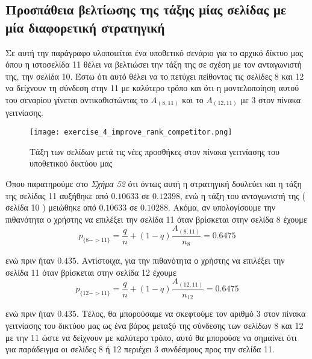 \documentclass[First Project.tex]{subfiles}
\begin{document}
\subsection{ Προσπάθεια βελτίωσης της τάξης μίας σελίδας με μία διαφορετική στρατηγική }

Σε αυτή την παράγραφο υλοποιείται ένα υποθετικό σενάριο για το αρχικό δίκτυο μας όπου η ιστοσελίδα 11 θέλει να
βελτιώσει την τάξη της σε σχέση με τον ανταγωνιστή της, την σελίδα 10. Έστω ότι αυτό θέλει να το πετύχει
πείθοντας τις σελίδες 8 και 12 να δείχνουν τη σύνδεση στην 11 με καλύτερο τρόπο και ότι η μοντελοποίηση αυτού 
του σεναρίου γίνεται αντικαθιστώντας το $A_{(8,11)}$ και το $Α_{(12,11)}$ με 3 στον πίνακα γειτνίασης. 

\begin{figure}[h!]
    \centering
    \captionsetup{justification=centering}
    \begin{center}
        \texttt{[image: exercise\_4\_improve\_rank\_competitor.png]}    
        \caption{ Τάξη των σελίδων μετά τις νέες προσθήκες στον πίνακα γειτνίασης του υποθετικού δικτύου μας }
    \end{center}
\end{figure} 

Όπου παρατηρούμε στο \textit{Σχήμα 52} ότι όντως αυτή η στρατηγική δουλεύει και η τάξη της σελίδας 11 αυξήθηκε από $0.10633$ σε 
$0.12398$, ενώ η τάξη του ανταγωνιστή της ( σελίδα 10 ) μειώθηκε από $0.10633$ σε $0.10288$. Ακόμα, αν υπολογίσουμε την πιθανότητα ο χρήστης 
να επιλέξει την σελίδα 11 όταν βρίσκεται στην σελίδα 8 έχουμε 
\begin{equation*}
    p_{\{8->11\}} = \frac{q}{n} + (1-q)\frac{A_{(8,11)}}{n_{8}} = 0.6475
\end{equation*}

ενώ πριν ήταν $0.435$. Αντίστοιχα, για την πιθανότητα ο χρήστης να επιλέξει την σελίδα 11 όταν βρίσκεται στην σελίδα 12 έχουμε
\begin{equation*}
    p_{\{12->11\}} = \frac{q}{n} + (1-q)\frac{A_{(12,11)}}{n_{12}} = 0.6475
\end{equation*}

ενώ πριν ήταν $0.435$. Τέλος, θα μπορούσαμε να σκεφτούμε τον αριθμό 3 στον πίνακα γειτνίασης του δικτύου μας ως ένα βάρος μεταξύ της σύνδεσης
των σελίδων 8 και 12 με την 11 ώστε να δείχνουν με καλύτερο τρόπο, αυτό θα μπορούσε να σημαίνει ότι για παράδειγμα οι σελίδες 8 ή 12 περιέχει 3
συνδέσμους προς την σελίδα 11.
\end{document}

